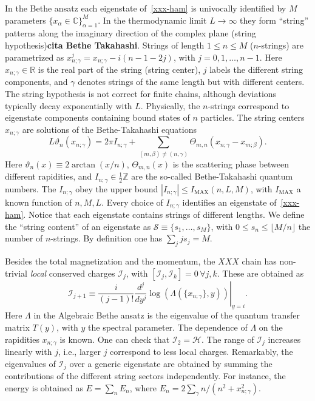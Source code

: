 \documentclass[twocolumn,superscriptaddress,prb,10pt]{revtex4-1}
\begin{document}
In the Bethe ansatz each eigenstate of~\eqref{xxx-ham} is univocally identified by
 $M$ parameters  $\{x_\alpha\in\mathbb{C}\}_{\alpha=1}^M$. In the thermodynamic limit 
$L\to\infty$ they form ``string'' patterns along the imaginary direction of the complex 
plane (string hypothesis){\bf cita Bethe Takahashi}. Strings of length $1\le n\le M$ 
($n$-strings) are parametrized as $x_{n;\gamma}^{j}=x_{n;\gamma}-i(n-1-2j)$, with 
$j=0,1,\dots,n-1$. Here $x_{n;\gamma}\in\mathbb{R}$ is the real part of the 
string (string center), $j$ labels the different string components, and $\gamma$ 
denotes strings of the same length but with 
different centers. The string hypothesis is not correct for finite 
chains, although deviations typically decay exponentially with $L$. Physically, the $n$-strings correspond 
to eigenstate components containing bound states of $n$ particles. 
The string centers $x_{n;\gamma}$ are solutions of the Bethe-Takahashi equations 
%
\begin{equation}
L\vartheta_n(x_{n;\gamma})=2\pi I_{n;\gamma}+\sum\limits_{(m,\beta)
\ne(n,\gamma)}\Theta_{m,n}(x_{n;\gamma}-x_{m;\beta}).
\label{bt-eq}
\end{equation}
%
Here $\vartheta_n(x)\equiv2\arctan(x/n)$, $\Theta_{m,n}(x)$ is the scattering 
phase between different rapidities, and $I_{n;\gamma}\in\frac{1}{2}
\mathbb{Z}$ are the so-called Bethe-Takahashi quantum numbers. 
The $I_{n;\gamma}$ obey the upper bound $|I_{n;\gamma}|\le I_{\textrm{MAX}}(n,L,M)$, 
with $I_{\textrm{MAX}}$ a known function of $n,M,L$. 
Every choice of $I_{n;\gamma}$ identifies an eigenstate of~\eqref{xxx-ham}. 
Notice that each eigenstate contains strings of different lengths. We define 
the ``string content'' of an eigenstate as ${\mathcal S}\equiv\{s_1,\dots,
s_M\}$, with $0\le s_n\le \lfloor M/n\rfloor$ the number of $n$-strings. By 
definition one has $\sum_{j}js_j=M$. 

Besides the total magnetization and the momentum, the $XXX$ chain has non-trivial 
{\it local} conserved charges ${\mathcal I}_j$, with $[{\mathcal I}_j,
{\mathcal I}_k]=0\,\forall j,k$. These are obtained as  
%
\begin{equation}
\label{I-def}
\left.{\mathcal I}_{j+1}\equiv\frac{i}{(j-1)!}\frac{d^j}{dy^j}\log(\Lambda
(\{x_{n;\gamma}\},y))
\right|_{y=i}.
\end{equation}
%
Here $\Lambda$ in the Algebraic Bethe ansatz is the eigenvalue of the quantum 
transfer matrix $T(y)$, with $y$ the spectral parameter. The dependence of 
$\Lambda$ on the rapidities $x_{n;\gamma}$ is known. One can check that 
${\mathcal I}_2={\mathcal H}$. The range of ${\mathcal I}_j$ increases 
linearly with $j$, i.e., larger $j$ correspond to less local charges. 
Remarkably, the eigenvalues of ${\mathcal I}_j$ over a generic eigenstate are 
obtained by summing the contributions of the different string sectors independently. 
For instance, the energy is obtained as $E=\sum_n E_n$, where $E_n=2\sum_\gamma n/
(n^2+x^2_{n;\gamma})$. 
\end{document}
